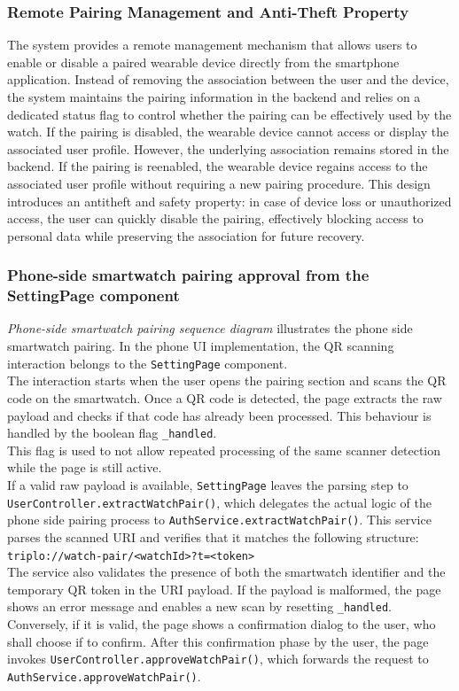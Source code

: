 \subsubsection{Remote Pairing Management and Anti-Theft Property}
The system provides a remote management mechanism that allows users to enable or disable a paired wearable device directly from the smartphone application.
Instead of removing the association between the user and the device, the system maintains the pairing information in the backend and relies on a dedicated status flag to control whether the pairing can be effectively used by the watch.
If the pairing is disabled, the wearable device cannot access or display the associated user profile. However, the underlying association remains stored in the backend.
If the pairing is reenabled, the wearable device regains access to the associated user profile without requiring a new pairing procedure.
This design introduces an antitheft and safety property: in case of device loss or unauthorized access, the user can quickly disable the pairing, effectively blocking access to personal data while preserving the association for future recovery.

\newpage
\subsubsection{Phone-side smartwatch pairing approval from the SettingPage component}
\textit{Phone-side smartwatch pairing sequence diagram} illustrates the phone side smartwatch pairing. In the phone UI implementation, the QR scanning interaction belongs to the \texttt{SettingPage} component.  \\
The interaction starts when the user opens the pairing section and scans the QR code on the smartwatch. Once a QR code is detected, the page extracts the raw payload and checks if that code has already been processed. This behaviour is handled by the boolean flag \texttt{\_handled}. \\
This flag is used to not allow repeated processing of the same scanner detection while the page is still active. \\
If a valid raw payload is available, \texttt{SettingPage} leaves the parsing step to \\\texttt{UserController.extractWatchPair()}, which delegates the actual logic of the phone side pairing process to \texttt{AuthService.extractWatchPair()}. This service parses the scanned URI and verifies that it matches the following structure: \\
\texttt{triplo://watch-pair/<watchId>?t=<token>}\\ 
The service also validates the presence of both the smartwatch identifier and the temporary QR token in the URI payload. If the payload is malformed, the page shows an error message and enables a new scan by resetting \texttt{\_handled}. \\
Conversely, if it is valid, the page shows a confirmation dialog to the user, who shall choose if to confirm. After this confirmation phase by the user, the page invokes \texttt{UserController.approveWatchPair()}, which forwards the request to \texttt{AuthService.approveWatchPair()}. \\

